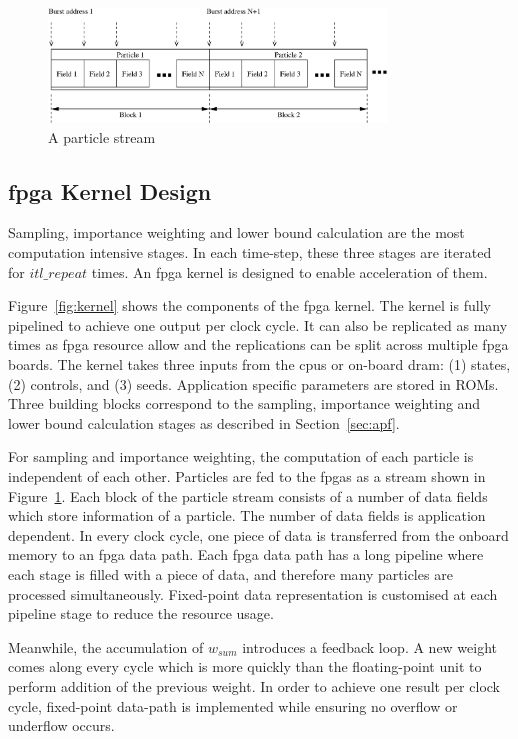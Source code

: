 \begin{figure}[t!]
\centering
\includegraphics[width=0.8\textwidth]{runtime_reconfiguration/figures/fig_particles}
\caption{A particle stream}
\label{fig:particles_stream}
\end{figure}

\subsection{\gls{fpga} Kernel Design}
Sampling, importance weighting and lower bound calculation are the most computation intensive stages.
In each time-step, these three stages are iterated for $itl\_repeat$ times.
An \gls{fpga} kernel is designed to enable acceleration of them.

Figure~\ref{fig:kernel} shows the components of the \gls{fpga} kernel.
The kernel is fully pipelined to achieve one output per clock cycle.
It can also be replicated as many times as \gls{fpga} resource allow and the replications can be split across multiple \gls{fpga} boards.
The kernel takes three inputs from the \gls{cpu}s or on-board \gls{dram}: (1) states, (2) controls, and (3) seeds.
Application specific parameters are stored in ROMs.
Three building blocks correspond to the sampling, importance weighting and lower bound calculation stages as described in Section~\ref{sec:apf}.

For sampling and importance weighting, the computation of each particle is independent of each other.
Particles are fed to the \gls{fpga}s as a stream shown in Figure~\ref{fig:particles_stream}.
Each block of the particle stream consists of a number of data fields which store information of a particle.
The number of data fields is application dependent.
In every clock cycle, one piece of data is transferred from the onboard memory to an \gls{fpga} data path.
Each \gls{fpga} data path has a long pipeline where each stage is filled with a piece of data, and therefore many particles are processed simultaneously.
Fixed-point data representation is customised at each pipeline stage to reduce the resource usage.

Meanwhile, the accumulation of $w_{sum}$ introduces a feedback loop.
A new weight comes along every cycle which is more quickly than the floating-point unit to perform addition of the previous weight.
In order to achieve one result per clock cycle, fixed-point data-path is implemented while ensuring no overflow or underflow occurs.

